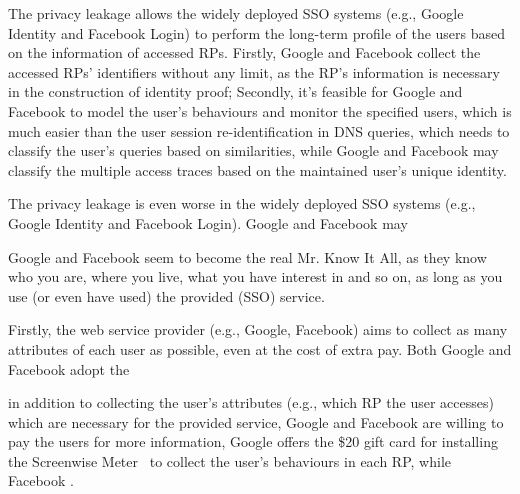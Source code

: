 

The privacy leakage allows the widely deployed SSO systems (e.g., Google Identity and Facebook Login) to perform the long-term profile of the users based on the information of accessed RPs. Firstly, Google and Facebook collect the accessed RPs' identifiers without any limit, as the RP's information is necessary in  the construction of identity proof;
Secondly, it's feasible for Google and Facebook to model the user's behaviours and monitor the specified users, which is much easier than the user session re-identification in DNS queries, which needs to classify the user's queries based on similarities, while Google and Facebook may classify the multiple access traces based on the maintained user's unique identity.

The privacy leakage is even worse in the widely deployed SSO systems (e.g., Google Identity and Facebook Login). Google and Facebook may

Google and Facebook seem to become the real Mr. Know It All, as they know who you are, where you live, what you have interest in and so on, as long as you use (or even have used) the provided (SSO) service.



Firstly, the web service provider (e.g., Google, Facebook) aims to collect as many attributes of each user as possible, even at the cost of extra pay. Both Google and Facebook adopt the


 in addition to collecting the user's attributes (e.g., which RP the user accesses) which are necessary for the provided service, Google and Facebook  are willing to pay the users for more information, Google offers the \$20 gift card for installing the Screenwise Meter~\cite{screenwiseMeter} to collect the user's behaviours in each RP, while Facebook .


